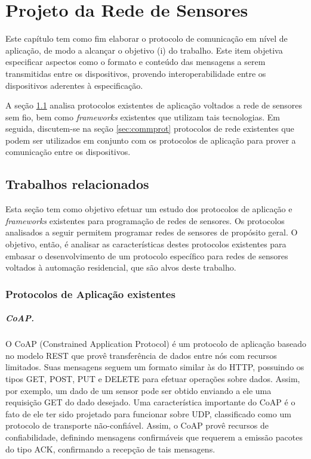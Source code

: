 \chapter{Projeto da Rede de Sensores}\label{chp:redesensores}
Este capítulo tem como fim elaborar o protocolo de comunicação em nível de aplicação, de modo a alcançar o objetivo (i) do trabalho. Este item objetiva especificar aspectos como o formato e conteúdo das mensagens a serem transmitidas entre os dispositivos, provendo interoperabilidade entre os dispositivos aderentes à especificação.

A seção \ref{sec:relwork} analisa protocolos existentes de aplicação voltados a rede de sensores sem fio, bem como \textit{frameworks} existentes que utilizam tais tecnologias. Em seguida, discutem-se na seção \ref{sec:commprot} protocolos de rede existentes que podem ser utilizados em conjunto com os protocolos de aplicação para prover a comunicação entre os dispositivos.

\section{Trabalhos relacionados}\label{sec:relwork}
Esta seção tem como objetivo efetuar um estudo dos protocolos de aplicação e \textit{frameworks} existentes para programação de redes de sensores. Os protocolos analisados a seguir permitem programar redes de sensores de propósito geral. O objetivo, então, é analisar as características destes protocolos existentes para embasar o desenvolvimento de um protocolo específico para redes de sensores voltados à automação residencial, que são alvos deste trabalho.

\subsection{Protocolos de Aplicação existentes}
\paragraph*{CoAP.} O CoAP (Constrained Application Protocol) \cite{rfc7252} é um protocolo de aplicação baseado no modelo REST que provê transferência de dados entre nós com recursos limitados. Suas mensagens seguem um formato similar às do HTTP, possuindo os tipos GET, POST, PUT e DELETE para efetuar operações sobre dados. Assim, por exemplo, um dado de um sensor pode ser obtido enviando a ele uma requisição GET do dado desejado. Uma característica importante do CoAP é o fato de ele ter sido projetado para funcionar sobre UDP, classificado como um protocolo de transporte não-confiável. Assim, o CoAP provê recursos de confiabilidade, definindo mensagens confirmáveis que requerem a emissão pacotes do tipo ACK, confirmando a recepção de tais mensagens.

